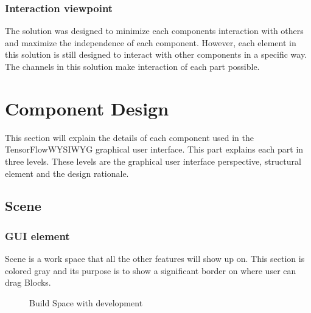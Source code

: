 \documentclass[journal,10pt,onecolumn,compsoc]{IEEEtran} \usepackage[margin=1.0in]{geometry} \usepackage{pdfpages}
\begin{document}
\subsubsection{Interaction viewpoint}
\noindent The solution was designed to minimize each components interaction with others and maximize the independence of each component.
However, each element in this solution is still designed to interact with other components in a specific way. 
The channels in this solution make interaction of each part possible.


\newpage

\section{Component Design}
\noindent This section will explain the details of each component used in the TensorFlow\texttrademark WYSIWYG graphical user interface. This part explains each part in three levels. These levels are the graphical user interface perspective, structural element and the design rationale.

\subsection{Scene}
\subsubsection{GUI element}
\noindent Scene is a work space that all the other features will show up on. 
This section is colored gray and its purpose is to show a significant border on where user can drag Blocks.
\begin{figure}[H]
\caption{Build Space with development}
\label{fig:Capstone}
\end{figure}
\end{document}
